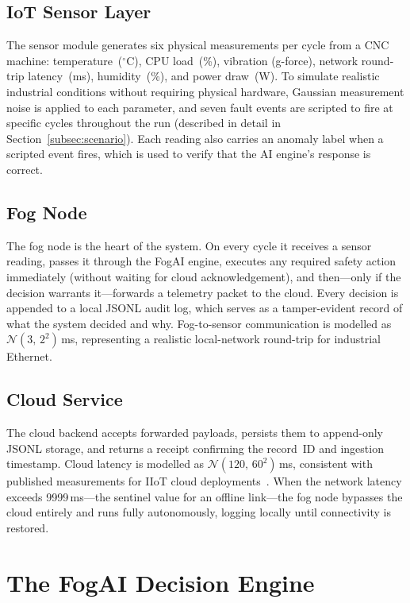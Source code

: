 \documentclass[conference]{IEEEtran}
\begin{document}
\subsection{IoT Sensor Layer}

The sensor module generates six physical measurements per cycle from a
CNC machine: temperature~($^\circ$C), CPU load~(\%), vibration
(g-force), network round-trip latency~(ms), humidity~(\%), and power
draw~(W).
To simulate realistic industrial conditions without requiring physical
hardware, Gaussian measurement noise is applied to each parameter, and
seven fault events are scripted to fire at specific cycles throughout
the run (described in detail in Section~\ref{subsec:scenario}).
Each reading also carries an anomaly label when a scripted event
fires, which is used to verify that the AI engine's response is correct.

\subsection{Fog Node}

The fog node is the heart of the system.
On every cycle it receives a sensor reading, passes it through the
FogAI engine, executes any required safety action immediately
(without waiting for cloud acknowledgement), and then---only if the
decision warrants it---forwards a telemetry packet to the cloud.
Every decision is appended to a local JSONL audit log, which serves
as a tamper-evident record of what the system decided and why.
Fog-to-sensor communication is modelled as $\mathcal{N}(3,\,2^2)$\,ms,
representing a realistic local-network round-trip for industrial
Ethernet.

\subsection{Cloud Service}

The cloud backend accepts forwarded payloads, persists them to
append-only JSONL storage, and returns a receipt confirming the
record~ID and ingestion timestamp.
Cloud latency is modelled as $\mathcal{N}(120,\,60^2)$\,ms, consistent
with published measurements for IIoT cloud deployments~\cite{shi2016edge}.
When the network latency exceeds 9999\,ms---the sentinel value for an
offline link---the fog node bypasses the cloud entirely and runs fully
autonomously, logging locally until connectivity is restored.


\section{The FogAI Decision Engine}
\label{sec:engine}
\end{document}
